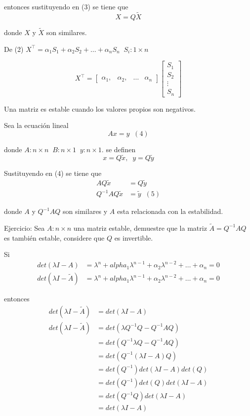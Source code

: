 entonces sustituyendo en (3) se tiene que
\[
    X=Q\tilde{X}
\]

donde \( X \) y \( \tilde{X} \) son similares.

De (2) \( X^\top = \alpha_{1}S_{1} + \alpha_{2}S_{2} + \ldots + \alpha_{n}S_{n}\;\; S_{i}:1\times n \)

\[
    X^\top = 
        \begin{bmatrix}
            \alpha_{1}, & \alpha_{2}, & \ldots & \alpha_{n}
        \end{bmatrix}
        \begin{bmatrix}
            S_{1} \\
            S_{2} \\
            \vdots \\
            S_{n}
        \end{bmatrix}
\]

Una matriz es estable cuando los valores propios son negativos.

Sea la ecuación lineal 
\[
    Ax=y \;\; (4)
\]

donde \( A:n\times n\;\; B:n\times 1\;\; y:n\times 1 \).
se definen
\[
    x=Q\tilde{x}, \;\; y=Q\tilde{y}
\]

Sustituyendo en (4) se tiene que 
\[
    \begin{split}
        AQ\tilde{x} & = Q\tilde{y} \\
        Q^{-1}AQ\tilde{x} & =\tilde{y} \;\; (5)
    \end{split}
\]

donde \( A \) y \( Q^{-1}AQ \) son similares y \(A\) esta relacionada con la estabilidad.

Ejercicio: Sea \( A:n\times n \) una matriz estable, demuestre que la matriz \( \tilde{A} = Q^{-1}AQ \) es también estable, considere que \( Q \) es invertible.

Si
\[
    \begin{split}
        det( \lambda I-A ) & = \lambda^n + alpha_{1}\lambda^{n-1} + \alpha_{2}\lambda^{n-2} + \ldots + \alpha_{n} = 0 \\
        det( \lambda I-\tilde{A} ) & = \lambda^n + alpha_{1}\lambda^{n-1} + \alpha_{2}\lambda^{n-2} + \ldots + \alpha_{n} = 0
    \end{split}
\]

entonces
\[
    \begin{split}
        det( \lambda I-\tilde{A} ) & = det( \lambda I-A ) \\
        det( \lambda I-\tilde{A} ) & = det( \lambda Q^{-1}Q-Q^{-1}AQ )\\
        & = det( Q^{-1}\lambda Q-Q^{-1}AQ ) \\
        & = det( Q^{-1}( \lambda I-A )Q ) \\
        & = det( Q^{-1} ) det( \lambda I-A ) det(Q) \\
        & = det( Q^{-1} ) det(Q) det( \lambda I-A ) \\
        & = det( Q^{-1}Q ) det( \lambda I-A ) \\
        & = det( \lambda I-A )
    \end{split}
\]

